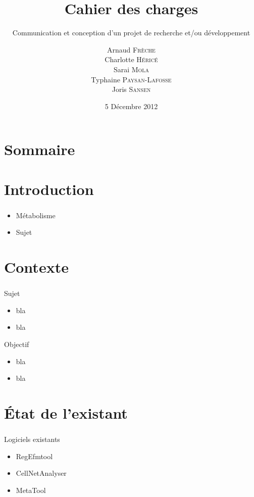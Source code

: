 \documentclass[11pt]{beamer}
\title{\textbf{Cahier des charges}}
\subtitle{Communication et conception d'un projet de recherche et/ou développement}
\date{5 Décembre 2012}
\author{Arnaud \textsc{Frèche} \\ Charlotte \textsc{Héricé} \\ Sarai \textsc{Mola}\\ Typhaine  \textsc{Paysan-Lafosse} \\ Joris \textsc{Sansen}}
\institute[Université Bordeaux 1] {Master 2 BioInformatique}
\begin{document}
\frame{\titlepage}

\section*{Sommaire}

\begin{frame}
  \tableofcontents
\end{frame}

\section{Introduction}			

\begin{frame}
	\frametitle{\secname}
	\begin{itemize}
	\item Métabolisme
	\item Sujet
	\end{itemize}
\end{frame}

\section{Contexte}			

\begin{frame}
	\frametitle{\secname}
	\begin{block}{Sujet}
		\begin{itemize}
		\item bla
		\item bla
		\end{itemize}
	\end{block}
	\begin{block}{Objectif}
		\begin{itemize}
		\item bla
		\item bla
		\end{itemize}
	\end{block}
\end{frame}

\section{État de l'existant}			

\begin{frame}
	\frametitle{\secname}
	\begin{block}{Logiciels existants}
		\begin{itemize}
		\item RegEfmtool
		\item CellNetAnalyser
		\item MetaTool
		\end{itemize}
	\end{block}
\end{frame}
\end{document}
